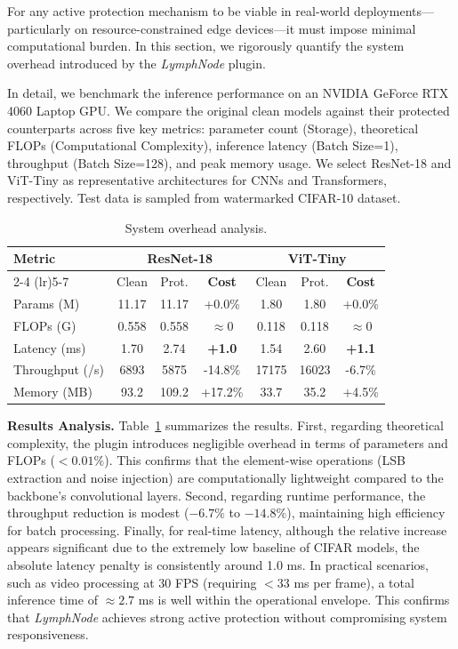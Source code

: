 \documentclass[conference]{IEEEtran}
\begin{document}
For any active protection mechanism to be viable in real-world deployments—particularly on resource-constrained edge devices—it must impose minimal computational burden. In this section, we rigorously quantify the system overhead introduced by the \textit{LymphNode} plugin.


In detail, we benchmark the inference performance on an NVIDIA GeForce RTX 4060 Laptop GPU. We compare the original clean models against their protected counterparts across five key metrics: parameter count (Storage), theoretical FLOPs (Computational Complexity), inference latency (Batch Size=1), throughput (Batch Size=128), and peak memory usage. We select ResNet-18 and ViT-Tiny as representative architectures for CNNs and Transformers, respectively. Test data is sampled from watermarked CIFAR-10 dataset.

\begin{table}[ht]
    \centering
    \caption{System overhead analysis.}
    \label{tab:overhead}
    \small
    \setlength{\tabcolsep}{2.5pt} 
    \renewcommand{\arraystretch}{1.15}
    
    \begin{tabular}{l | ccc | ccc}
        \toprule
        \multirow{2}{*}{\textbf{Metric}} & \multicolumn{3}{c|}{\textbf{ResNet-18}} & \multicolumn{3}{c}{\textbf{ViT-Tiny}} \\
        \cmidrule(lr){2-4} \cmidrule(lr){5-7}
         & Clean & Prot. & \textbf{Cost} & Clean & Prot. & \textbf{Cost} \\
        \midrule
        Params (M)      & 11.17 & 11.17 & +0.0\%   & 1.80  & 1.80  & +0.0\% \\
        FLOPs (G)       & 0.558 & 0.558 & $\approx 0$ & 0.118 & 0.118 & $\approx 0$ \\
        Latency (ms)    & 1.70  & 2.74  & \textbf{+1.0} & 1.54  & 2.60  & \textbf{+1.1} \\
        Throughput (/s) & 6893  & 5875  & -14.8\%  & 17175 & 16023 & -6.7\% \\
        Memory (MB)     & 93.2  & 109.2 & +17.2\%  & 33.7  & 35.2  & +4.5\% \\
        \bottomrule
    \end{tabular}
\end{table}
\textbf{Results Analysis.}
Table~\ref{tab:overhead} summarizes the results. 
First, regarding theoretical complexity, the plugin introduces negligible overhead in terms of parameters and FLOPs ($<0.01\%$). This confirms that the element-wise operations (LSB extraction and noise injection) are computationally lightweight compared to the backbone's convolutional layers.
Second, regarding runtime performance, the throughput reduction is modest ($-6.7\%$ to $-14.8\%$), maintaining high efficiency for batch processing.
Finally, for real-time latency, although the relative increase appears significant due to the extremely low baseline of CIFAR models, the absolute latency penalty is consistently around 1.0 ms. In practical scenarios, such as video processing at 30 FPS (requiring $<33$ ms per frame), a total inference time of $\approx 2.7$ ms is well within the operational envelope. This confirms that \textit{LymphNode} achieves strong active protection without compromising system responsiveness.
\end{document}
